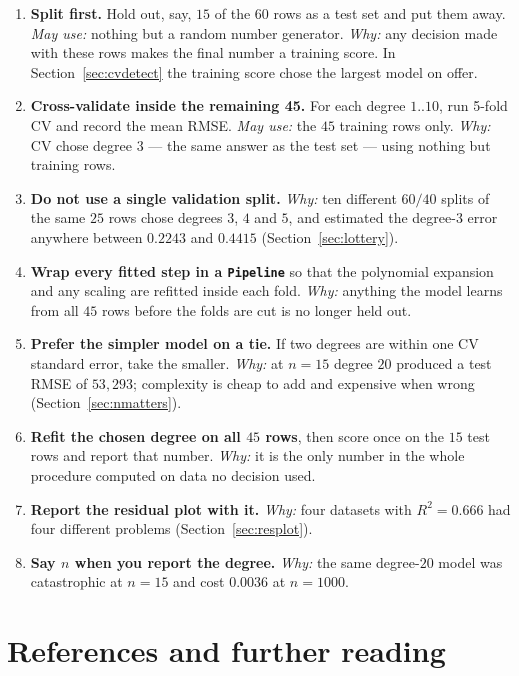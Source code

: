 \documentclass[11pt]{article}
\begin{document}
\begin{enumerate}[leftmargin=*]
  \item \textbf{Split first.} Hold out, say, $15$ of the $60$ rows as a test
    set and put them away. \emph{May use:} nothing but a random number
    generator. \emph{Why:} any decision made with these rows makes the final
    number a training score. In Section~\ref{sec:cvdetect} the training score
    chose the largest model on offer.
  \item \textbf{Cross-validate inside the remaining 45.} For each degree
    $1..10$, run 5-fold CV and record the mean RMSE. \emph{May use:} the $45$
    training rows only. \emph{Why:} CV chose degree $3$ --- the same answer as
    the test set --- using nothing but training rows.
  \item \textbf{Do not use a single validation split.} \emph{Why:} ten
    different $60/40$ splits of the same $25$ rows chose degrees $3$, $4$ and
    $5$, and estimated the degree-3 error anywhere between $0.2243$ and
    $0.4415$ (Section~\ref{sec:lottery}).
  \item \textbf{Wrap every fitted step in a \texttt{Pipeline}} so that the
    polynomial expansion and any scaling are refitted inside each fold.
    \emph{Why:} anything the model learns from all $45$ rows before the folds
    are cut is no longer held out.
  \item \textbf{Prefer the simpler model on a tie.} If two degrees are within
    one CV standard error, take the smaller. \emph{Why:} at $n = 15$ degree
    $20$ produced a test RMSE of $53{,}293$; complexity is cheap to add and
    expensive when wrong (Section~\ref{sec:nmatters}).
  \item \textbf{Refit the chosen degree on all $45$ rows}, then score once on
    the $15$ test rows and report that number. \emph{Why:} it is the only
    number in the whole procedure computed on data no decision used.
  \item \textbf{Report the residual plot with it.} \emph{Why:} four datasets
    with $R^2 = 0.666$ had four different problems (Section~\ref{sec:resplot}).
  \item \textbf{Say $n$ when you report the degree.} \emph{Why:} the same
    degree-$20$ model was catastrophic at $n = 15$ and cost $0.0036$ at
    $n = 1000$.
\end{enumerate}

\section{References and further reading}
\end{document}

